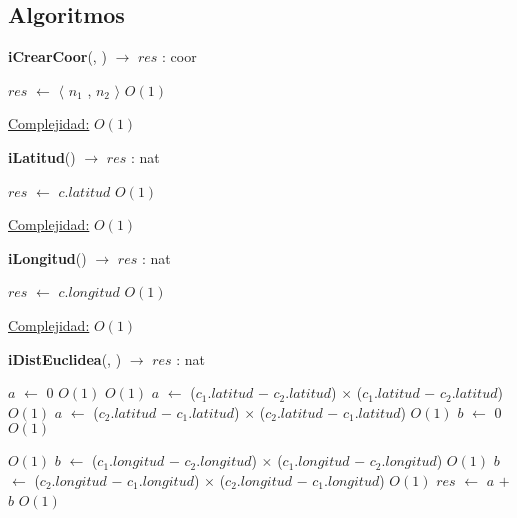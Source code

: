 \begin{Algoritmos}
\subsection{Algoritmos}
   
\begin{algorithm}[H]{\textbf{iCrearCoor}(, ) $\to$ $res$ : coor}
\begin{algorithmic}[1]
	\State $res$ $\gets$  $\langle$ $n_1$ , $n_2$ $\rangle$ \Comment $O(1)$

	\medskip
	\Statex \underline{Complejidad:} $O(1)$
\end{algorithmic}
\end{algorithm}
   
\begin{algorithm}[H]{\textbf{iLatitud}() $\to$ $res$ : nat}
\begin{algorithmic}[1]
	\State $res$ $\gets$  $c$.$latitud$ \Comment $O(1)$

	\medskip
	\Statex \underline{Complejidad:} $O(1)$
			
\end{algorithmic}
\end{algorithm}


\begin{algorithm}[H]{\textbf{iLongitud}() $\to$ $res$ : nat}
\begin{algorithmic}[1]
	\State $res$ $\gets$  $c$.$longitud$ \Comment $O(1)$

	\medskip
	\Statex \underline{Complejidad:} $O(1)$
\end{algorithmic}
\end{algorithm}

\begin{algorithm}[H]{\textbf{iDistEuclidea}(, ) $\to$ $res$ : nat}
\begin{algorithmic}[1]
    \State $a$ $\gets$ $0$ \Comment $O(1)$
    	\Comment $O(1)$
		\State $a$ $\gets$ ($c_1$.$latitud$ $-$ $c_2$.$latitud$) $\times$ ($c_1$.$latitud$ $-$ $c_2$.$latitud$) \Comment $O(1)$	
	\Else 
		\State $a$ $\gets$ ($c_2$.$latitud$ $-$ $c_1$.$latitud$) $\times$ ($c_2$.$latitud$ $-$ $c_1$.$latitud$) \Comment $O(1)$	
	\EndIf
	\State $b$ $\gets$ $0$ \Comment $O(1)$

		\Comment $O(1)$
		\State $b$ $\gets$ ($c_1$.$longitud$ $-$ $c_2$.$longitud$) $\times$ ($c_1$.$longitud$ $-$ $c_2$.$longitud$)  \Comment $O(1)$	
	\Else 
		\State $b$ $\gets$ ($c_2$.$longitud$ $-$ $c_1$.$longitud$) $\times$ ($c_2$.$longitud$ $-$ $c_1$.$longitud$) \Comment $O(1)$	
	\EndIf
	\State $res$ $\gets$  $a$ $+$ $b$ \Comment $O(1)$


\end{algorithmic}
\end{algorithm}
\end{Algoritmos}
